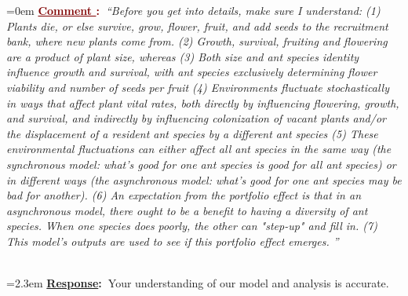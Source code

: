 \documentclass[12pt]{article}
\newcounter{cN}
\newcommand{\comment}[1]{
	\vspace{2em}
	\refstepcounter{cN} %
	\noindent \hangindent=0em \textbf{\textcolor{Maroon}{\uline{Comment \thecN}:~}}\emph{``#1''}
	}
\newcommand{\response}[1]{
	\\[0.25em]
	\hangindent=2.3em \textbf{\textcolor{NavyBlue}{\uline{Response}:~}}#1
	}
\begin{document}
\comment{Before you get into details, make sure I understand:
(1)     Plants die, or else survive, grow, flower, fruit, and add seeds to the recruitment bank, where new plants come from.
(2)     Growth, survival, fruiting and flowering are a product of plant size, whereas
(3)     Both size and ant species identity influence growth and survival, with ant species exclusively determining flower viability and number of seeds per fruit
(4)     Environments fluctuate stochastically in ways that affect plant vital rates, both directly by influencing flowering, growth, and survival, and indirectly by influencing colonization of vacant plants and/or the displacement of a resident ant species by a different ant species
(5)     These environmental fluctuations can either affect all ant species in the same way (the synchronous model:  what's good for one ant species is good for all ant species) or in different ways (the asynchronous model: what's good for one ant species may be bad for another).
(6)     An expectation from the portfolio effect is that in an asynchronous model, there ought to be a benefit to having a diversity of ant species. When one species does poorly, the other can "step-up" and fill in.
(7)     This model's outputs are used to see if this portfolio effect emerges. }
\response{Your understanding of our model and analysis is accurate.}


\end{document}
